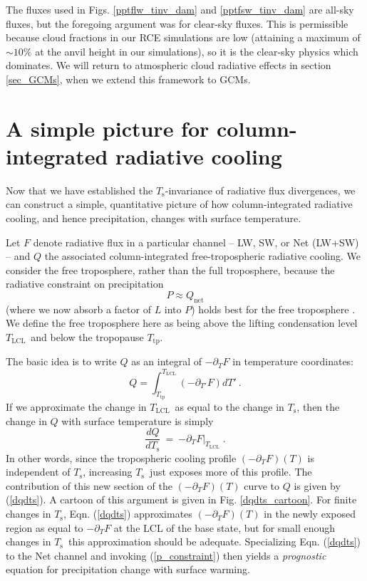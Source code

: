 \documentclass[10pt]{article}
\newcommand{\beqn}{\begin{equation}}
\newcommand{\eeqn}{\end{equation}}
\newcommand{\eqnref}[1]{(\ref{#1})}
\newcommand{\n}{\nonumber}
\newcommand{\der}[2]{\ensuremath{\frac{d #1}{d #2}}}
\newcommand{\ppt}{\ensuremath{\partial_T}}
\newcommand{\Qnet}{\ensuremath{Q_\mathrm{net}}}
\newcommand{\Ts}{\ensuremath{T_\mathrm{s}}}
\newcommand{\Tlcl}{\ensuremath{T_\mathrm{LCL}}}
\newcommand{\Ttp}{\ensuremath{T_\mathrm{tp}}}
\begin{document}
The fluxes used in Figs.  \ref{pptflw_tinv_dam} and \ref{pptfsw_tinv_dam} are all-sky fluxes, but the foregoing argument was for clear-sky fluxes. This is permissible because cloud fractions in our RCE simulations are low (attaining a maximum of $\sim 10 \%$ at the anvil height in our simulations), so it is the clear-sky physics which dominates. We will return to atmospheric cloud radiative effects in section \ref{sec_GCMs}, when we extend this framework to GCMs.
 
		
\section{A simple picture for column-integrated radiative cooling} \label{sec_simple_Q}

Now that we have established  the \Ts-invariance of radiative flux divergences, we can construct a simple, quantitative picture of how column-integrated radiative cooling, and hence precipitation,  changes with surface temperature. 
	
	Let $F$ denote radiative flux in a particular channel -- LW, SW, or Net (LW+SW) -- and $Q$ the associated column-integrated free-tropospheric radiative cooling. We consider  the free troposphere, rather than the full troposphere, because the radiative constraint on precipitation 
		\beqn
			P \approx \Qnet
		\label{p_constraint}
		\eeqn
		 (where we now absorb a factor of $L$ into $P$) holds best for the free troposphere  \citep{ogorman2012}. We define the free troposphere here as being above the lifting condensation level \Tlcl\ and below the tropopause \Ttp.
	
	  The basic idea is to write $Q$ as an integral of $-\ppt F$  in temperature coordinates: 
	\beqn
		Q =  \int_{\Ttp}^{\Tlcl} (-\partial_{T'} F) dT' \ . 
		\n
	\eeqn
   If we approximate the change in  \Tlcl\ as equal to the change in \Ts, then the change in $Q$ with surface temperature is  simply
	\beqn
		\der{Q}{\Ts} \ =\  \left.  -\ppt F\right|_{\Tlcl}  \; .
	\label{dqdts}
	\eeqn
In other words, since the tropospheric cooling profile $(-\ppt F)(T)$  is independent of \Ts, increasing \Ts\ just exposes more of this profile.  The contribution of this new section of the $(-\ppt F)(T)$ curve to $Q$ is given by \eqnref{dqdts}.  A cartoon of this argument is given in Fig. \ref{dqdts_cartoon}. For finite changes in \Ts, Eqn. \eqnref{dqdts} approximates $(-\ppt F)(T)$ in the newly exposed region as equal to $-\ppt F$ at the LCL of the base state, but for small enough changes in \Ts\ this approximation should be adequate. Specializing Eqn. \eqnref{dqdts} to the Net channel and invoking \eqnref{p_constraint} then yields a \emph{prognostic} equation for precipitation change with surface warming.
\end{document}
